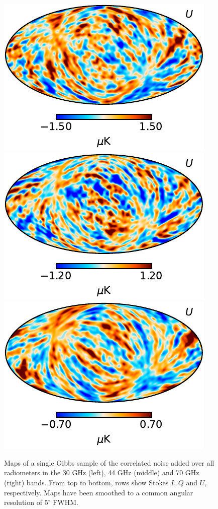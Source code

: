 \documentclass[twocolumn]{aa}
\begin{document}
\begin{figure}
\begin{center}
		\includegraphics[width=0.33\linewidth]{figs/tod_030_ncorr_c0001_k000060_U_Stokes_w8_n512_300arcmin_cb_c-planck.pdf}
		\includegraphics[width=0.33\linewidth]{figs/tod_044_ncorr_c0001_k000060_U_Stokes_w8_n512_300arcmin_cb_c-planck.pdf}
		\includegraphics[width=0.33\linewidth]{figs/tod_070_ncorr_c0001_k000060_U_Stokes_w8_n1024_300arcmin_cb_c-planck.pdf}
	\end{center}
	\caption{Maps of a single Gibbs sample of the correlated noise
		added over all radiometers in the 30 GHz (left), 44 GHz
		(middle) and 70 GHz (right) bands. From top to bottom, rows show Stokes $I$, $Q$
		and $U$, respectively. Maps have been smoothed to a common angular resolution
		of $5^{\circ}$ FWHM. 
		\label{fig:ncorr_map}}
\end{figure}
\end{document}
